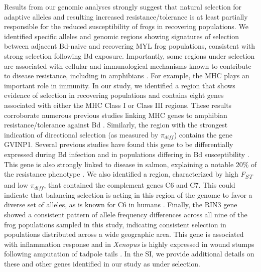 \documentclass[9pt,twocolumn,twoside,lineno]{pnas-new}
\begin{document}
Results from our genomic analyses strongly suggest that natural
selection for adaptive alleles and resulting increased
resistance/tolerance is at least partially responsible for the reduced
susceptibility of frogs in recovering populations. We identified
specific alleles and genomic regions showing signatures of selection
between adjacent Bd-naive and recovering MYL frog populations,
consistent with strong selection following Bd exposure. Importantly,
some regions under selection are associated with cellular and
immunological mechanisms known to contribute to disease resistance,
including in amphibians \citep{zamudio2020}. For example, the MHC plays
an important role in immunity. In our study, we identified a region that
shows evidence of selection in recovering populations and contains eight
genes associated with either the MHC Class I or Class III regions. These
results corroborate numerous previous studies linking MHC genes to
amphibian resistance/tolerance against Bd
\citep[e.g.,][]{savage2011, bataille2015}. Similarly, the region with
the strongest indication of directional selection (as measured by
\(\pi_{diff}\)) contains the gene GVINP1. Several previous studies have
found this gene to be differentially expressed during Bd infection
\citep[e.g.,][]{grogan2018, ellison2014} and in populations differing in
Bd susceptibility \citep{grogan2018}. This gene is also strongly linked
to disease in salmon, explaining a notable 20\% of the resistance
phenotype \citep{robledo2020, robledo2018}. We also identified a region,
characterized by high \emph{F\textsubscript{ST}} and low \(\pi_{diff}\),
that contained the complement genes C6 and C7. This could indicate that
balancing selection is acting in this region of the genome to favor a
diverse set of alleles, as is known for C6 in humans
\citep{soejima2005}. Finally, the RIN3 gene showed a consistent pattern
of allele frequency differences across all nine of the frog populations
sampled in this study, indicating consistent selection in populations
distributed across a wide geographic area. This gene is associated with
inflammation response and in \emph{Xenopus} is highly expressed in wound
stumps following amputation of tadpole tails \citep{fukazawa2009}. In
the SI, we provide additional details on these and other genes
identified in our study as under selection.
\end{document}
